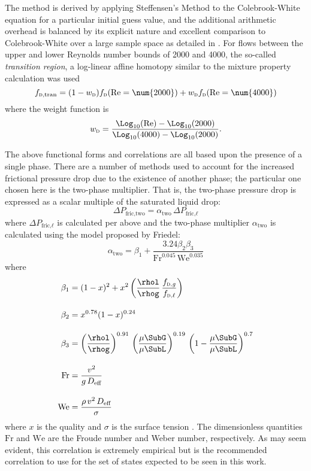 The method is derived by applying Steffensen's Method to the Colebrook-White equation for a particular initial guess value, and the additional arithmetic overhead is balanced by its explicit nature and excellent comparison to Colebrook-White over a large sample space as detailed in \cite{burden_numerical_2004,winning_explicit_2012}.
For flows between the upper and lower Reynolds number bounds of \num{2000} and \num{4000}, the so-called \textit{transition region}, a log-linear affine homotopy similar to the mixture property calculation was used
\begin{equation}
    f_{\text{\textsc{d},tran}} =    (1-w_{\text{\textsc{d}}}) f_{\text{\textsc{d}}}(\text{Re} = \num{2000}) + 
                                       w_{\text{\textsc{d}}}  f_{\text{\textsc{d}}}(\text{Re} = \num{4000})
\end{equation}
where the weight function is 
\begin{equation}
    w_{\text{\textsc{d}}} = \frac{\Log_{10}(\text{Re}) - \Log_{10}(\text{2000})}{\Log_{10}(\text{4000}) - \Log_{10}(\text{2000})}.
\end{equation}

The above functional forms and correlations are all based upon the presence of a single phase.
There are a number of methods used to account for the increased frictional pressure drop due to the existence of another phase; the particular one chosen here is the two-phase multiplier.
That is, the two-phase pressure drop is expressed as a scalar multiple of the saturated liquid drop:
\begin{equation}
    \Delta{P}_{\text{fric,two}} = \alpha_{\text{two}}\,\Delta{P}_{\text{fric,}\ell}
\end{equation}
where $\Delta{P}_{\text{fric,}\ell}$ is calculated per above and the two-phase multiplier $\alpha_{\text{two}}$ is calculated using the model proposed by Friedel:
\begin{equation}
    \alpha_{\text{two}} = \beta_1 + \frac{3.24 \beta_2 \beta_3}{\text{Fr}^{0.045}\,\text{We}^{0.035}}
\end{equation}
where 
\begin{align*}
    \beta_1   &= (1-x)^2 + x^2 \left( \frac{\rhol}{\rhog}\,\frac{f_{\text{\textsc{d,}}\mathit{g}}}{f_{\text{\textsc{d,}}\ell}} \right) \\[1em]
    \beta_2   &= x^{0.78} (1-x)^{0.24} \\[1em]
    \beta_3   &= \left(\frac{\rhol}{\rhog}\right)^{0.91}\,\left(\frac{\mu\SubG}{\mu\SubL}\right)^{0.19}\,\left(1 -\frac{\mu\SubG}{\mu\SubL}\right)^{0.7} \\[1em]
    \text{Fr} &= \frac{v^2}{g\,D_{\text{eff}}} \\[1em]
    \text{We} &= \frac{\rho\,v^2\,D_{\text{eff}}}{\sigma}
\end{align*}
where $x$ is the quality and $\sigma$ is the surface tension \cite{collier_convective_1994}.
The dimensionless quantities $\text{Fr}$ and $\text{We}$ are the Froude number and Weber number, respectively.
As may seem evident, this correlation is extremely empirical but is the recommended correlation to use for the set of states expected to be seen in this work.




